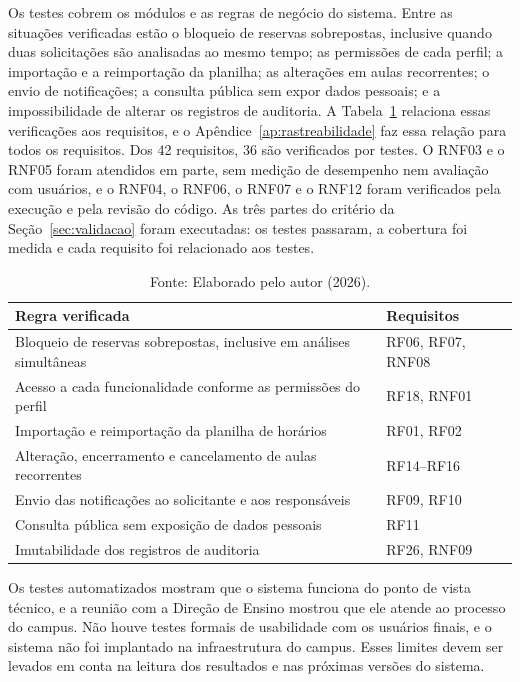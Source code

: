 Os testes cobrem os módulos e as regras de negócio do sistema. Entre as situações verificadas estão o bloqueio de reservas sobrepostas, inclusive quando duas solicitações são analisadas ao mesmo tempo; as permissões de cada perfil; a importação e a reimportação da planilha; as alterações em aulas recorrentes; o envio de notificações; a consulta pública sem expor dados pessoais; e a impossibilidade de alterar os registros de auditoria. A Tabela~\ref{tab:testes} relaciona essas verificações aos requisitos, e o Apêndice~\ref{ap:rastreabilidade} faz essa relação para todos os requisitos. Dos 42 requisitos, 36 são verificados por testes. O RNF03 e o RNF05 foram atendidos em parte, sem medição de desempenho nem avaliação com usuários, e o RNF04, o RNF06, o RNF07 e o RNF12 foram verificados pela execução e pela revisão do código. As três partes do critério da Seção~\ref{sec:validacao} foram executadas: os testes passaram, a cobertura foi medida e cada requisito foi relacionado aos testes.

\begin{table}[!htb]
	\centering
	\caption{Regras de negócio verificadas pelos testes}
	\begin{tabular}{@{}>{\raggedright\arraybackslash}p{9.8cm}>{\raggedright\arraybackslash}p{4.0cm}@{}}
	\hline
		\textbf{Regra verificada} & \textbf{Requisitos} \\ \hline
		Bloqueio de reservas sobrepostas, inclusive em análises simultâneas & RF06, RF07, RNF08 \\
		Acesso a cada funcionalidade conforme as permissões do perfil & RF18, RNF01 \\
		Importação e reimportação da planilha de horários & RF01, RF02 \\
		Alteração, encerramento e cancelamento de aulas recorrentes & RF14--RF16 \\
		Envio das notificações ao solicitante e aos responsáveis & RF09, RF10 \\
		Consulta pública sem exposição de dados pessoais & RF11 \\
		Imutabilidade dos registros de auditoria & RF26, RNF09 \\ \hline
	\end{tabular}
	\caption*{\footnotesize Fonte: Elaborado pelo autor (2026).}
	\label{tab:testes}
\end{table}

Os testes automatizados mostram que o sistema funciona do ponto de vista técnico, e a reunião com a Direção de Ensino mostrou que ele atende ao processo do campus. Não houve testes formais de usabilidade com os usuários finais, e o sistema não foi implantado na infraestrutura do campus. Esses limites devem ser levados em conta na leitura dos resultados e nas próximas versões do sistema.

